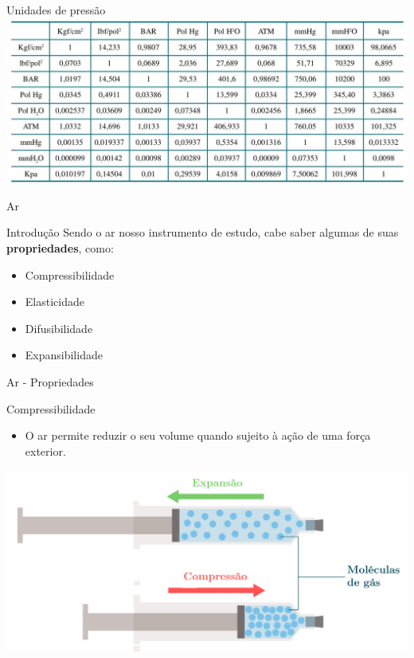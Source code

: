 \begin{frame}{Unidades de pressão}
	\centering
	\includegraphics[width=1\linewidth]{Figuras/Ch11/fig8}
\end{frame}


\begin{frame}{Ar}
\begin{block}{Introdução}
	Sendo o ar nosso instrumento de estudo, cabe saber algumas de suas \textbf{propriedades}, como:
	\begin{itemize}
		\item Compressibilidade
		\item Elasticidade
		\item Difusibilidade
		\item Expansibilidade
	\end{itemize}
\end{block}
\end{frame}


\begin{frame}{Ar - Propriedades}
	\begin{block}{Compressibilidade}
		\begin{itemize}
			\item O ar permite reduzir o seu volume quando sujeito à ação de uma força exterior.
		\end{itemize}
	\end{block}
\centering
\includegraphics[width=1\linewidth]{Figuras/Ch11/fig9}
\end{frame}


